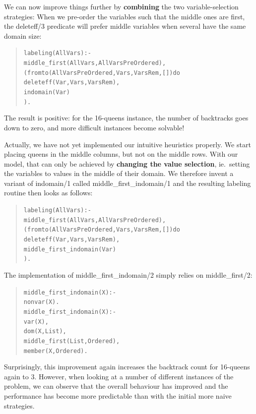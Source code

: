 We can now improve things further by {\bf combining} the two
variable-selection strategies:
When we pre-order the variables such that the middle ones are first,
the deleteff/3 predicate will prefer middle variables when several
have the same domain size:
\begin{quote}\begin{alltt}
labeling(AllVars) :-
        middle_first(AllVars, AllVarsPreOrdered), %
        ( fromto(AllVarsPreOrdered, Vars, VarsRem, []) do
            deleteff(Var, Vars, VarsRem),       %
            indomain(Var)                       %
        ).
\end{alltt}\end{quote}
The result is positive: for the 16-queens instance,
the number of backtracks goes down to zero,
and more difficult instances become solvable!

Actually, we have not yet implemented our intuitive heuristics properly.
We start placing queens in the middle columns, but not on the middle rows.
With our model, that can only be achieved by {\bf changing the value selection},
ie.\ setting the variables to values in the middle of their domain.
We therefore invent a variant of indomain/1 called middle\_first\_indomain/1
and the resulting labeling routine then looks as follows:
\begin{quote}\begin{alltt}
labeling(AllVars) :-
        middle_first(AllVars, AllVarsPreOrdered), %
        ( fromto(AllVarsPreOrdered, Vars, VarsRem, []) do
            deleteff(Var, Vars, VarsRem),       %
            middle_first_indomain(Var)          %
        ).
\end{alltt}\end{quote}
The implementation of middle\_first\_indomain/2
simply relies on middle\_first/2:
\begin{quote}\begin{alltt}
middle_first_indomain(X) :-
        nonvar(X).
middle_first_indomain(X) :-
        var(X),
        dom(X, List),    %
        middle_first(List, Ordered),
        member(X, Ordered).
\end{alltt}\end{quote}
Surprisingly, this improvement again increases the backtrack count for
16-queens again to 3.
However, when looking at a number of different instances of the problem,
we can observe that the overall behaviour has improved and the
performance has become more predictable than with the
initial more naive strategies.


